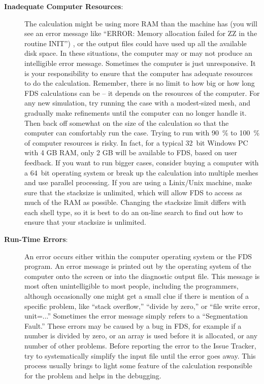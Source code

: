 \documentclass[11pt]{book}
\begin{document}
\begin{description}
\item[{\bf Inadequate Computer Resources}:]
The calculation might be using more RAM than the machine
has (you will see an error message like ``ERROR: Memory allocation failed for ZZ in the routine INIT'') , or the output files could have used up all the available disk space. In these situations, the
computer may or may not produce an intelligible error message. Sometimes the computer is just
unresponsive. It is your responsibility to ensure that the computer has adequate resources to
do the calculation. Remember, there is no limit to how big or how long FDS calculations can be -- it
depends on the resources of the computer. For any new simulation, try running the case with a modest-sized mesh,
and gradually make refinements until the computer can no longer handle it. Then back off
somewhat on the size of the calculation so that the computer can comfortably run the
case. Trying to run with 90~\% to 100~\% of computer resources is risky.
In fact, for a typical 32~bit Windows PC with 4 GB RAM, only 2 GB will be available to FDS, based on user feedback.
If you want to run bigger cases, consider buying a computer with a 64~bit operating system or break up the
calculation into multiple meshes and use parallel processing. If you are using a Linix/Unix machine, make sure that
the stacksize is unlimited, which will allow FDS to access as much of the RAM as possible. Changing the stacksize
limit differs with each shell type, so it is best to do an on-line search to find out how to ensure that your
stacksize is unlimited.

\item[{\bf Run-Time Errors}:]
An error occurs either within the computer operating system or the
FDS program. An error message is printed out by the operating system of
the computer onto the screen or into the diagnostic output file. This
message is most often unintelligible to most people, including the programmers,
although occasionally one might get a small clue if there is mention of a specific problem,
like ``stack overflow,'' ``divide by zero,'' or ``file write error, unit=...''
Sometimes the error message simply refers to a ``Segmentation Fault.''
These errors may be caused by a bug in FDS, for example if a number is divided by zero,
or an array is used before it is allocated, or any number of other problems.
Before reporting the error to the Issue Tracker, try to systematically simplify the
input file until the error goes away. This process usually brings to light some feature of the
calculation responsible for the problem and helps in the debugging.


\end{description}
\end{document}
